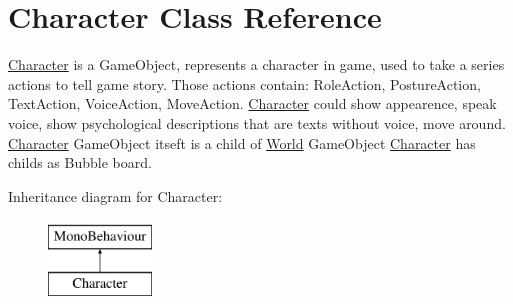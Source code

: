 \hypertarget{class_character}{}\section{Character Class Reference}
\label{class_character}


\hyperlink{class_character}{Character} is a Game\+Object, represents a character in game, used to take a series actions to tell game story. Those actions contain\+: Role\+Action, Posture\+Action, Text\+Action, Voice\+Action, Move\+Action. \hyperlink{class_character}{Character} could show appearence, speak voice, show psychological descriptions that are texts without voice, move around. \hyperlink{class_character}{Character} Game\+Object itseft is a child of \hyperlink{class_world}{World} Game\+Object \hyperlink{class_character}{Character} has childs as Bubble board.  


Inheritance diagram for Character\+:\begin{figure}[H]
\begin{center}
\leavevmode
\includegraphics[height=2.000000cm]{class_character}
\end{center}
\end{figure}
